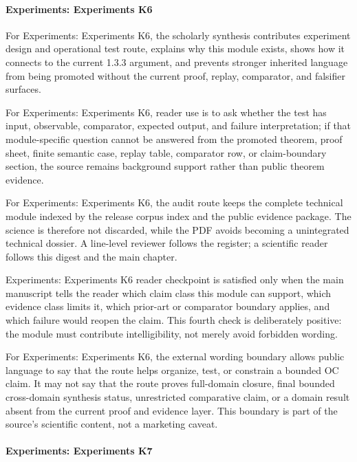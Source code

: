 \paragraph{Experiments: Experiments K6}

For Experiments: Experiments K6, the scholarly synthesis contributes experiment design and operational test route, explains why this module exists, shows how it connects to the current 1.3.3 argument, and prevents stronger inherited language from being promoted without the current proof, replay, comparator, and falsifier surfaces.


For Experiments: Experiments K6, reader use is to ask whether the test has input, observable, comparator, expected output, and failure interpretation; if that module-specific question cannot be answered from the promoted theorem, proof sheet, finite semantic case, replay table, comparator row, or claim-boundary section, the source remains background support rather than public theorem evidence.


For Experiments: Experiments K6, the audit route keeps the complete technical module indexed by the release corpus index and the public evidence package. The science is therefore not discarded, while the PDF avoids becoming a unintegrated technical dossier. A line-level reviewer follows the register; a scientific reader follows this digest and the main chapter.


Experiments: Experiments K6 reader checkpoint is satisfied only when the main manuscript tells the reader which claim class this module can support, which evidence class limits it, which prior-art or comparator boundary applies, and which failure would reopen the claim. This fourth check is deliberately positive: the module must contribute intelligibility, not merely avoid forbidden wording.


For Experiments: Experiments K6, the external wording boundary allows public language to say that the route helps organize, test, or constrain a bounded OC claim. It may not say that the route proves full-domain closure, final bounded cross-domain synthesis status, unrestricted comparative claim, or a domain result absent from the current proof and evidence layer. This boundary is part of the source's scientific content, not a marketing caveat.


\paragraph{Experiments: Experiments K7}

